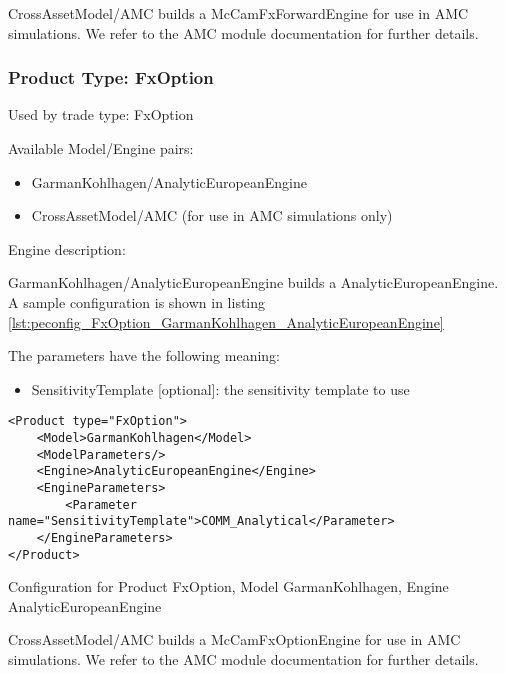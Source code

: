 CrossAssetModel/AMC builds a McCamFxForwardEngine for use in AMC simulations. We refer to the AMC module documentation
for further details.

\subsubsection{Product Type: FxOption}

Used by trade type: FxOption

Available Model/Engine pairs:

\begin{itemize}
\item GarmanKohlhagen/AnalyticEuropeanEngine
\item CrossAssetModel/AMC (for use in AMC simulations only)
\end{itemize}

Engine description:

GarmanKohlhagen/AnalyticEuropeanEngine builds a AnalyticEuropeanEngine. A sample configuration is shown in listing
\ref{lst:peconfig_FxOption_GarmanKohlhagen_AnalyticEuropeanEngine}

The parameters have the following meaning:

\begin{itemize}
\item SensitivityTemplate [optional]: the sensitivity template to use 
\end{itemize}

\begin{longlisting}
\begin{verbatim}
<Product type="FxOption">
    <Model>GarmanKohlhagen</Model>
    <ModelParameters/>
    <Engine>AnalyticEuropeanEngine</Engine>
    <EngineParameters>
        <Parameter name="SensitivityTemplate">COMM_Analytical</Parameter>
    </EngineParameters>
</Product>
\end{verbatim}
\caption{Configuration for Product FxOption, Model GarmanKohlhagen, Engine AnalyticEuropeanEngine}
\label{lst:peconfig_FxOption_GarmanKohlhagen_AnalyticEuropeanEngine}
\end{longlisting}

CrossAssetModel/AMC builds a McCamFxOptionEngine for use in AMC simulations. We refer to the AMC module documentation
for further details.

